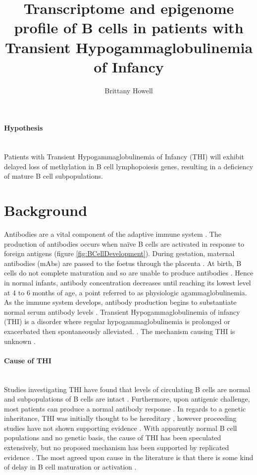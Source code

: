 \documentclass[12pt]{article}
\title{\vspace{-2cm} Transcriptome and epigenome profile of B cells in patients with Transient Hypogammaglobulinemia of Infancy}
\date{}
\author{Brittany Howell}
\newcommand{\naive}{na\"{i}ve }
\begin{document}
	\maketitle
	
	\paragraph{Hypothesis}
	~\\
	Patients with Transient Hypogammaglobulinemia of Infancy (THI) will exhibit delayed loss of methylation in B cell lymphopoiesis genes, resulting in a deficiency of mature B cell subpopulations.
	
	\section{Background}
		
		Antibodies are a vital component of the adaptive immune system \citep{Simon15}. 
		The production of antibodies occurs when \naive B cells are activated in response to foreign antigens (figure \ref{fig:BCellDevelopment}).
		During gestation, maternal antibodies (mAbs) are passed to the foetus through the placenta \citep{Hasselquist09}.
		At birth, B cells do not complete maturation and so are unable to produce antibodies \citep{Martin10,Rechavi15}.
		Hence in normal infants, antibody concentration decreases until reaching its lowest level at 4 to 6 months of age, a point referred to as physiologic agammaglobulinemia. 
		As the immune system develops, antibody production begins to substantiate normal serum antibody levels \citep{Dressler89}.
		Transient Hypogammaglobulinemia of infancy (THI) is a disorder where regular hypogammaglobulinemia is prolonged or exacerbated then spontaneously alleviated. \citep{Dressler89,AlHerz14,Gitlin56,AlHerz11,Rosen66,McGeady87,Stiemh80, Dalal98,Tiller78,Buckley83}.
		The mechanism causing THI is unknown \citep{AlHerz14}. 

			
		\paragraph{Cause of THI} 
			~\\
			Studies investigating THI have found that levels of circulating B cells are normal and subpopulations of B cells are intact \citep{Tiller78,Stiemh80,Siegel81,Buckley83,Fiorilli86,Dressler89}.
			Furthermore, upon antigenic challenge, most patients can produce a normal antibody response \citep{Tiller78,Stiemh80,Buckley83,McGeady87,Dressler89,Dalal98}.
			In regards to a genetic inheritance, THI was initially thought to be hereditary \citep{Willenbockel60, Soothill68}, however proceeding studies have not shown supporting evidence \citep{Tiller78,Fiorilli86,Ovadia14}.
			With apparently normal B cell populations and no genetic basis, the cause of THI has been speculated extensively, but no proposed mechanism has been supported by replicated evidence \citep{Fudenberg64,Rosen66,Nathenson71,Willenbockel60,Soothill68,Tiller78,Fiorilli86,Ovadia14,Siegel81,McGeady87}.
			The most agreed upon cause in the literature is that there is some kind of delay in B cell maturation or activation \citep{McGeady87,Stiemh80,Walker94,Rosen84}. 
			
\end{document}
